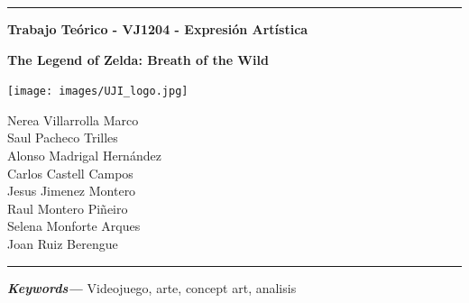 \documentclass[12pt]{article}
\date{}
\providecommand{\keywords}[1]
{
  \small
  \textbf{\textit{Keywords---}} #1
}
\begin{document}
    \begin{titlepage}

        \centering
        \hrule
        \vspace{1cm}
        {\bfseries\huge Trabajo Teórico - VJ1204 - Expresión Artística \par}
        \vspace{1cm}
        {\bfseries\huge The Legend of Zelda: Breath of the Wild \par}
        \vspace{3cm}
        {\texttt{[image: images/UJI\_logo.jpg]} \par}
        \vspace{4cm}

        {\large
        Nerea Villarrolla Marco \\
        Saul Pacheco Trilles \\
        Alonso Madrigal Hernández \\
        Carlos Castell Campos \\
        Jesus Jimenez Montero \\
        Raul Montero Piñeiro \\
        Selena Monforte Arques \\
        Joan Ruiz Berengue \\
        \par}
        \vspace{10cm}
        \hrule

    \end{titlepage}

\newpage
\begin{abstract}
    En el siguiente documento hablaremos sobre las bases artísticas del videojuego “The Legend Of Zelda: Breath of the wild". Tanto del director de concept art como un atisbo de información sobre el juego. Finalemnete acabaremos con el analisis artistico profundo de varios fan arts.

\end{abstract}

\keywords{Videojuego, arte, concept art, analisis}

\newpage
\tableofcontents
\setcounter{tocdepth}{4}
\end{document}
